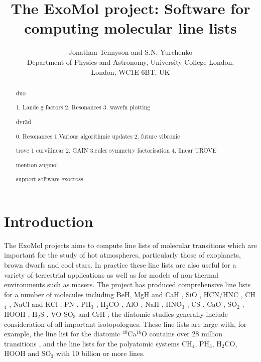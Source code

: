 \documentclass[12pt]{article}
\title{The ExoMol project: Software for computing molecular line lists}
\author {Jonathan Tennyson and  S.N. Yurchenko\\
Department of Physics and Astronomy, University College London,\\ London, WC1E 6BT, UK}
\newcommand{\2}{$_{2}$}
\newcommand{\3}{$_{3}$}
\newcommand{\4}{$_{4}$}
\begin{document}
\maketitle

\begin{abstract}

duo

1. Lande g factors
2. Resonances
3. wavefn plotting


dvr3d

0. Resonances
1.Various algorithmic updates
2. future vibronic




trove
1 curvilinear
2. GAIN
3.euler symmetry factorisation
4. linear TROVE


mention angmol

support software
exocross

\end{abstract}

\section {Introduction}

The ExoMol projects aims to compute line lists of molecular transitions
which are important for the study of hot atmospheres, particularly those
of exoplanets, brown dwarfs and cool stars.\cite{jt528} In practice
these line lists are also useful for a variety of terrestrial applications
as well as for models of non-thermal environments such as masers.
The project has produced comprehensive line lists for a number of molecules
including
BeH,
MgH and
CaH \cite{jt529},
SiO \cite{jt563},
HCN/HNC \cite{jt570},
CH$_4$ \cite{jt564},
NaCl and
KCl \cite{jt583},
PN \cite{jt590},
PH$_3$ \cite{jt593},
H$_2$CO \cite{jt593},
AlO \cite{jt598},
NaH \cite{jt605},
HNO$_3$ \cite{jt614},
CS \cite{jt615},
CaO \cite{jt618},
SO$_2$ \cite{jt635},
HOOH \cite{jtHOOH},
H$_2$S \cite{jth2s},
VO \cite{jtVO}
SO$_3$ \cite{jtSO3}
and CrH \cite{jtCrH};
the diatomic studies generally include consideration
of all important isotopologues. These line lists are large with,
for example, the line list for the diatomic $^{40}$Ca$^{16}$O contains
over 28 million transitions \cite{jt618}, and the line lists
for the polyatomic systems CH$_4$, PH$_3$, H$_2$CO, HOOH and SO$_3$
with 10 billion or more lines.
\end{document}
